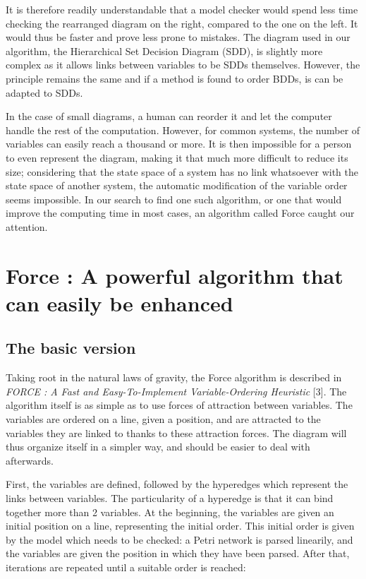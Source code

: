 \documentclass[12pt]{report}
\begin{document}
It is therefore readily understandable that a model checker would spend less time checking the rearranged diagram on the right, compared to the one on the left. It would thus be faster and prove less prone to mistakes. The diagram used in our algorithm, the Hierarchical Set Decision Diagram (SDD), is slightly more complex as it allows links between variables to be SDDs themselves. However, the principle remains the same and if a method is found to order BDDs, is can be adapted to SDDs.

In the case of small diagrams, a human can reorder it and let the computer handle the rest of the computation. However, for common systems, the number of variables can easily reach a thousand or more. It is then impossible for a person to even represent the diagram, making it that much more difficult to reduce its size; considering that the state space of a system has no link whatsoever with the state space of another system, the automatic modification of the variable order seems impossible. In our search to find one such algorithm, or one that would improve the computing time in most cases, an algorithm called Force caught our attention.

\chapter{Force : A powerful algorithm that can easily be enhanced}

\section{The basic version} \label{basic_force}

Taking root in the natural laws of gravity, the Force algorithm is described in \textit{FORCE : A Fast and Easy-To-Implement Variable-Ordering Heuristic} [3]. The algorithm itself is as simple as to use forces of attraction between variables. The variables are ordered on a line, given a position, and are attracted to the variables they are linked to thanks to these attraction forces. The diagram will thus organize itself in a simpler way, and should be easier to deal with afterwards.

First, the variables are defined, followed by the hyperedges which represent the links between variables. The particularity of a hyperedge is that it can bind together more than 2 variables. At the beginning, the variables are given an initial position on a line, representing the initial order. This initial order is given by the model which needs to be checked: a Petri network is parsed linearily, and the variables are given the position in which they have been parsed. After that, iterations are repeated until a suitable order is reached:
\end{document}
